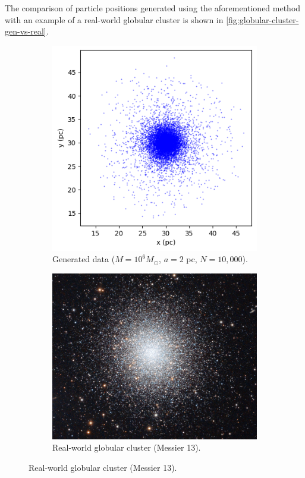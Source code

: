 The comparison of particle positions generated using the aforementioned method with an example of a real-world globular cluster is shown in \autoref{fig:globular-cluster-gen-vs-real}.
\begin{figure}[htp]
    \centering
    \begin{subfigure}[b]{0.4\textwidth}
        \centering
        \includegraphics[width=\textwidth]{img/globular_generated.png}
        \caption{Generated data ($M=10^{6} M_\odot$, $a=2$ pc, $N=10,000$).}
        \label{fig:glob-cluster-model-generated}
    \end{subfigure}
    \hfill
    \begin{subfigure}[b]{0.4\textwidth}
        \centering
        \includegraphics[width=\textwidth]{img/glob_cluster_m13.jpg}
        \caption{Real-world globular cluster (Messier 13).}
        \label{fig:messier-13}
    \end{subfigure}


\end{figure}
